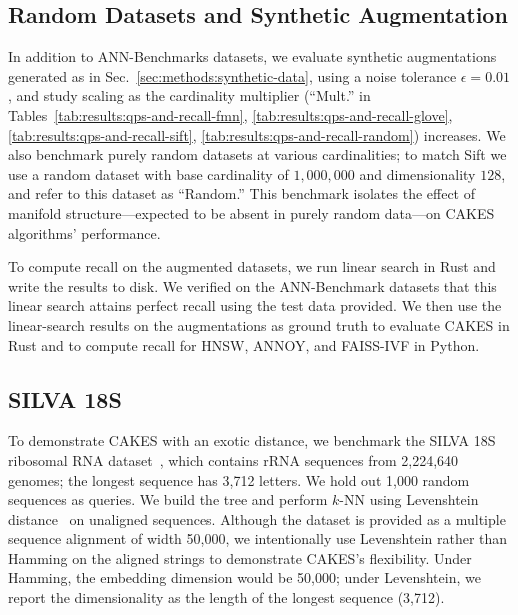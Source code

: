 \subsection{Random Datasets and Synthetic Augmentation}
\label{sec:datasets-and-benchmarks:random-datasets}


In addition to ANN-Benchmarks datasets, we evaluate synthetic augmentations generated as in Sec.~\ref{sec:methods:synthetic-data}, using a noise tolerance $\epsilon=0.01$, and study scaling as the cardinality multiplier (“Mult.” in Tables~\ref{tab:results:qps-and-recall-fmn}, \ref{tab:results:qps-and-recall-glove}, \ref{tab:results:qps-and-recall-sift}, \ref{tab:results:qps-and-recall-random}) increases. We also benchmark purely random datasets at various cardinalities; to match Sift we use a random dataset with base cardinality of $1{,}000{,}000$ and dimensionality $128$, and refer to this dataset as “Random.” This benchmark isolates the effect of manifold structure—expected to be absent in purely random data—on CAKES algorithms’ performance.

To compute recall on the augmented datasets, we run linear search in Rust and write the results to disk. We verified on the ANN-Benchmark datasets that this linear search attains perfect recall using the test data provided. We then use the linear-search results on the augmentations as ground truth to evaluate CAKES in Rust and to compute recall for HNSW, ANNOY, and FAISS-IVF in Python.



\subsection{SILVA 18S}
\label{sec:datasets-and-benchmarks:silva-18s}

To demonstrate CAKES with an exotic distance, we benchmark the SILVA 18S ribosomal RNA dataset~\cite{10.1093/nar/gks1219}, which contains rRNA sequences from 2,224,640 genomes; the longest sequence has 3,712 letters. We hold out 1,000 random sequences as queries. We build the tree and perform $k$-NN using Levenshtein distance~\cite{levenshtein1966binary} on unaligned sequences. Although the dataset is provided as a multiple sequence alignment of width 50{,}000, we intentionally use Levenshtein rather than Hamming on the aligned strings to demonstrate CAKES’s flexibility. Under Hamming, the embedding dimension would be 50{,}000; under Levenshtein, we report the dimensionality as the length of the longest sequence (3{,}712).

